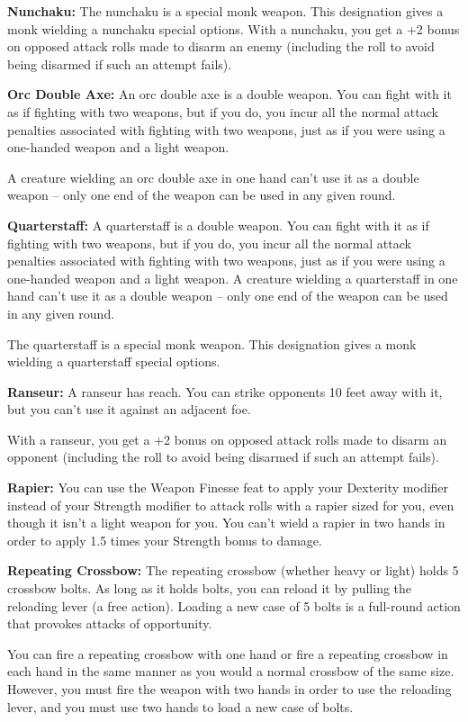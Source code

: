 \textbf{Nunchaku:} The nunchaku is a special monk weapon. This designation gives 
a monk wielding a nunchaku special options. With a nunchaku, you get a +2 bonus 
on opposed attack rolls made to disarm an enemy (including the roll to avoid being 
disarmed if such an attempt fails).

\textbf{Orc Double Axe:} An orc double axe is a double weapon. You can fight with 
it as if fighting with two weapons, but if you do, you incur all the normal attack 
penalties associated with fighting with two weapons, just as if you were using 
a one-handed weapon and a light weapon.

A creature wielding an orc double axe in one hand can't use it as a double weapon -- only 
one end of the weapon can be used in any given round.

\textbf{Quarterstaff:} A quarterstaff is a double weapon. You can fight with it 
as if fighting with two weapons, but if you do, you incur all the normal attack 
penalties associated with fighting with two weapons, just as if you were using 
a one-handed weapon and a light weapon. A creature wielding a quarterstaff in one 
hand can't use it as a double weapon -- only one end of the weapon can be used in 
any given round.

The quarterstaff is a special monk weapon. This designation gives a monk wielding 
a quarterstaff special options.

\textbf{Ranseur:} A ranseur has reach. You can strike opponents 10 feet away with 
it, but you can't use it against an adjacent foe.

With a ranseur, you get a +2 bonus on opposed attack rolls made to disarm an opponent 
(including the roll to avoid being disarmed if such an attempt fails).

\textbf{Rapier:} You can use the Weapon Finesse feat to apply your Dexterity modifier 
instead of your Strength modifier to attack rolls with a rapier sized for you, 
even though it isn't a light weapon for you. You can't wield a rapier in two hands 
in order to apply 1.5 times your Strength bonus to damage.

\textbf{Repeating Crossbow:} The repeating crossbow (whether heavy or light) holds 
5 crossbow bolts. As long as it holds bolts, you can reload it by pulling the reloading 
lever (a free action). Loading a new case of 5 bolts is a full-round action that 
provokes attacks of opportunity.

You can fire a repeating crossbow with one hand or fire a repeating crossbow in 
each hand in the same manner as you would a normal crossbow of the same size. However, 
you must fire the weapon with two hands in order to use the reloading lever, and 
you must use two hands to load a new case of bolts.

